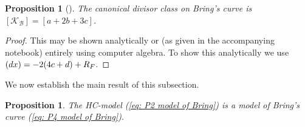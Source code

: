 \documentclass{amsart}
\newtheorem{prop}[theorem]{Proposition}
\let\div\relax
\DeclareMathOperator{\div}{div}
\begin{document}
\begin{prop}[\cite{Braden2012}]\label{prop: Canonical divisor of Bring's curve}
The canonical divisor class on Bring's curve is $[\mathcal{K}_{\mathcal{B}}] = [a+2b+3c]$.
\end{prop}
\begin{proof}
This may be shown analytically or (as given in the accompanying notebook) entirely using computer algebra. To show this analytically we use $\div(dx) = -2(4c+d) + R_F$.
\end{proof}

We now establish the main result of this subsection.
\begin{prop}\label{prop: HC valid model for Bring}
The HC-model (\ref{eq: P2 model of Bring}) is a model of Bring's curve (\ref{eq: P4 model of Bring}).
\end{prop}
\end{document}
